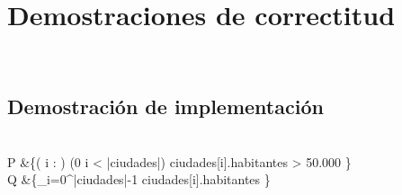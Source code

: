 \documentclass[10pt,a4paper]{article}
\begin{document}
\section{Demostraciones de correctitud}
		\vspace{0.1cm}  \\
\subsection{Demostración de implementación}


\begin{multiline}
	 \\
	P &\equiv \{( \exists i : \ent) (0 \leq i < |ciudades|) \yLuego ciudades[i].habitantes > 50.000 \wedge {} \} \\
	\vspace{0.1cm}
	Q &\equiv \{\sum_{i=0}^{|ciudades|-1} ciudades[i].habitantes \} \\
\end{multiline}
\end{document}
